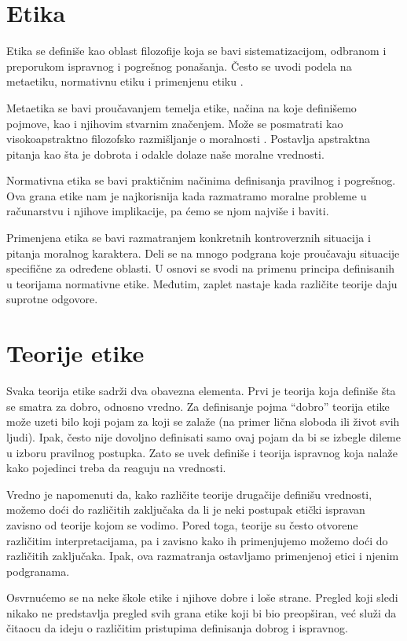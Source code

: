\documentclass[a4paper]{article}
\begin{document}
\section{Etika}
Etika se definiše kao oblast filozofije koja se bavi sistematizacijom, odbranom i preporukom ispravnog i pogrešnog ponašanja. Često se uvodi podela na metaetiku, normativnu etiku i primenjenu etiku \cite{ethics-iep}. 

Metaetika se bavi proučavanjem temelja etike, načina na koje definišemo pojmove, kao i njihovim stvarnim značenjem. Može se posmatrati kao visokoapstraktno filozofsko razmišljanje o moralnosti \cite{metaethics-iep}. Postavlja apstraktna pitanja kao šta je dobrota i odakle dolaze naše moralne vrednosti.

Normativna etika se bavi praktičnim načinima definisanja pravilnog i pogrešnog. Ova grana etike nam je najkorisnija kada razmatramo moralne probleme u računarstvu i njihove implikacije, pa ćemo se njom najviše i baviti. 

Primenjena etika se bavi razmatranjem konkretnih kontroverznih situacija i pitanja moralnog karaktera. Deli se na mnogo podgrana koje proučavaju situacije specifične za određene oblasti. U osnovi se svodi na primenu principa definisanih u teorijama normativne etike. Međutim, zaplet nastaje kada različite teorije daju suprotne odgovore. 

\section{Teorije etike}
Svaka teorija etike sadrži dva obavezna elementa. Prvi je teorija koja definiše šta se smatra za dobro, odnosno vredno. Za definisanje pojma ``dobro'' teorija etike može uzeti bilo koji pojam za koji se zalaže (na primer lična sloboda ili život svih ljudi). Ipak, često nije dovoljno definisati samo ovaj pojam da bi se izbegle dileme u izboru pravilnog postupka. Zato se uvek definiše i teorija ispravnog koja nalaže kako pojedinci treba da reaguju na vrednosti. 

Vredno je napomenuti da, kako različite teorije drugačije definišu vrednosti, možemo doći do različitih zaključaka da li je neki postupak etički ispravan zavisno od teorije kojom se vodimo. Pored toga, teorije su često otvorene različitim interpretacijama, pa i zavisno kako ih primenjujemo možemo doći do različitih zaključaka. Ipak, ova razmatranja ostavljamo primenjenoj etici i njenim podgranama. 

Osvrnućemo se na neke škole etike i njihove dobre i loše strane. Pregled koji sledi nikako ne predstavlja pregled svih grana etike koji bi bio preopširan, već služi da čitaocu da ideju o različitim pristupima definisanja dobrog i ispravnog. 
\end{document}
